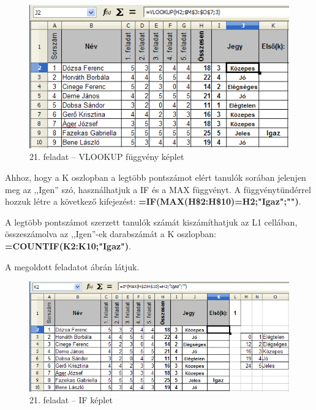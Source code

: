 \begin{figure}[!h]
\begin{center}
\includegraphics[width=13.333cm]{oocalcv1-img99.png}
\caption{21. feladat --  VLOOKUP függvény képlet}\label{21-feladatVLOOKUPKéplet}
\end{center}
\end{figure}

Ahhoz, hogy a K oszlopban a legtöbb pontszámot elért tanulók
sorában jelenjen meg az ,,Igen''
szó, használhatjuk a IF és a MAX függvényt. A
függvénytündérrel hozzuk létre a következő
kifejezést:
\textsf{\textbf{=IF(MAX(H\$2:H\$10)=H2;"Igaz";"")}}.

A legtöbb pontszámot szerzett tanulók számát
kiszámíthatjuk az L1 cellában, összeszámolva az
,,Igen''-ek darabszámát a K oszlopban:
\textsf{\textbf{=COUNTIF(K2:K10;"Igaz")}}.

A megoldott feladatot  ábrán látjuk.

\begin{figure}[!h]
\begin{center}
\includegraphics[width=15.999cm]{oocalcv1-img100.png}
\caption{21.  feladat --  IF képlet}\label{21-feladatIF}
\end{center}
\end{figure}


